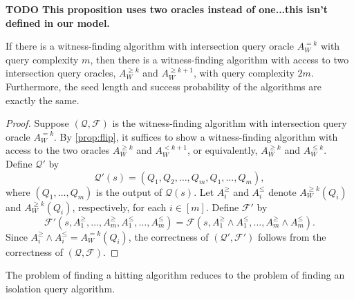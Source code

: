 \documentclass{article}
\newcommand{\todo}[1]{\textbf{TODO #1}}
\newcommand{\mc}{\mathcal}
\begin{document}
\todo{This proposition uses two oracles instead of one...this isn't defined in our model.}

\begin{proposition}
  If there is a witness-finding algorithm with intersection query oracle $A^{=k}_W$ with query complexity $m$, then there is a witness-finding algorithm with access to two intersection query oracles, $A^{\geq k}_W$ and $A^{\geq k + 1}_W$,  with query complexity $2m$.
  Furthermore, the seed length and success probability of the algorithms are exactly the same.
\end{proposition}
\begin{proof}
  Suppose $(\mc{Q}, \mc{F})$ is the witness-finding algorithm with intersection query oracle $A^{=k}_W$.
  By \autoref{prop:flip}, it suffices to show a witness-finding algorithm with access to the two oracles $A^{\geq k}_W$ and $A^{< k + 1}_W$, or equivalently, $A^{\geq k}_W$ and $A^{\leq k}_W$.
  Define $\mc{Q}'$ by
  \begin{equation*}
    \mc{Q}'(s) = (Q_1, Q_2, \dotsc, Q_m, Q_1, \dotsc, Q_m),
  \end{equation*}
  where $(Q_1, \dotsc, Q_m)$ is the output of $\mc{Q}(s)$.
  Let $A^\geq_i$ and $A^\leq_i$ denote $A^{\geq k}_W(Q_i)$ and $A^{\geq k}_W(Q_i)$, respectively, for each $i \in [m]$.
  Define $\mc{F}'$ by
  \begin{equation*}
    \mc{F}'(s, A^\geq_1, \dotsc, A^\geq_m, A^\leq_1, \dotsc, A^\leq_m) = \mc{F}(s, A^\geq_1 \land A^\leq_1, \dotsc, A^\geq_m \land A^\leq_m).
  \end{equation*}
  Since $A^\geq_i \land A^\leq_i = A^{= k}_W(Q_i)$, the correctness of $(\mc{Q}', \mc{F}')$ follows from the correctness of $(\mc{Q}, \mc{F})$.
\end{proof}

The problem of finding a hitting algorithm reduces to the problem of finding an isolation query algorithm.
\end{document}
